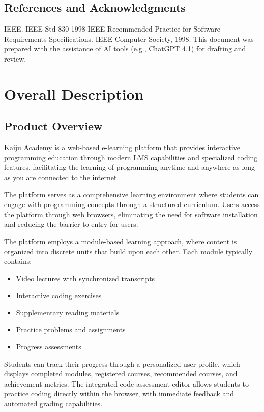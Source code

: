 \documentclass[a4paper, 11pt]{scrreprt}
\begin{document}
\section{References and Acknowledgments}
IEEE. IEEE Std 830-1998 IEEE Recommended Practice for Software Requirements Specifications. IEEE Computer Society, 1998.
This document was prepared with the assistance of AI tools (e.g., ChatGPT 4.1) for drafting and review.


\chapter{Overall Description}
\section{Product Overview}
Kaiju Academy is a web-based e-learning platform that provides interactive programming education through modern LMS capabilities and specialized coding features, facilitating the learning of programming anytime and anywhere as long as you are connected to the internet.

The platform serves as a comprehensive learning environment where students can engage with programming concepts through a structured curriculum. Users access the platform through web browsers, eliminating the need for software installation and reducing the barrier to entry for users.

The platform employs a module-based learning approach, where content is organized into discrete units that build upon each other. Each module typically contains:

\begin{itemize}
    \item Video lectures with synchronized transcripts
    \item Interactive coding exercises
    \item Supplementary reading materials
    \item Practice problems and assignments
    \item Progress assessments
\end{itemize}

Students can track their progress through a personalized user profile, which displays completed modules, registered courses, recommended courses, and achievement metrics. The integrated code assessment editor allows students to practice coding directly within the browser, with immediate feedback and automated grading capabilities.
\end{document}
